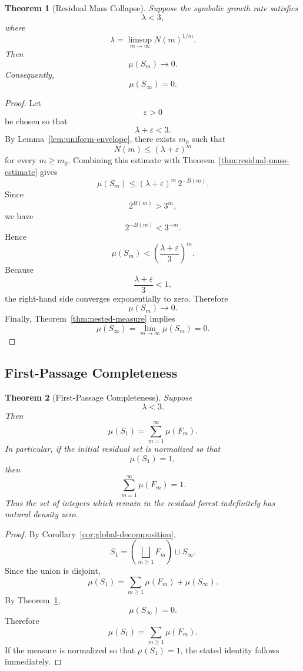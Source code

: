 \documentclass[12pt, oneside]{article}
\numberwithin{equation}{section}
\theoremstyle{definition}
\theoremstyle{plain}
\newtheorem{theorem}{Theorem}[section]
\theoremstyle{remark}
\begin{document}
\begin{theorem}[Residual Mass Collapse]
\label{thm:residual-mass-collapse}
Suppose the symbolic growth rate satisfies
\[
\lambda<3,
\]
where
\[
\lambda = \limsup_{m\to\infty} N(m)^{1/m}.
\]
Then
\[
\mu(S_m) \longrightarrow 0.
\]
Consequently,
\[
\mu(S_\infty) = 0.
\]
\end{theorem}

\begin{proof}
Let
\[
\varepsilon > 0
\]
be chosen so that
\[
\lambda + \varepsilon < 3.
\]
By Lemma~\ref{lem:uniform-envelope}, there exists
\(m_0\) such that
\[
N(m) \le (\lambda+\varepsilon)^m
\] 
for every \(m\ge m_0\).  Combining this estimate with
Theorem~\ref{thm:residual-mass-estimate} gives
\[
\mu(S_m) \le (\lambda+\varepsilon)^m \,2^{-B(m)}.
\]
Since
\[
2^{B(m)} > 3^m,
\]
we have
\[
2^{-B(m)} < 3^{-m}.
\]
Hence
\[ \mu(S_m) < \left( \frac{\lambda+\varepsilon}{3} \right)^m.
\]
Because
\[
\frac{\lambda+\varepsilon} {3} < 1,
\]
the right-hand side converges exponentially to zero. Therefore
\[
\mu(S_m) \to 0.
\]
Finally, Theorem~\ref{thm:nested-measure} implies
\[
\mu(S_\infty) = \lim_{m\to\infty}\mu(S_m) = 0.
\]
\end{proof}

\subsection{First-Passage Completeness}

\begin{theorem}[First-Passage Completeness]
\label{thm:first-passage-completeness}
Suppose
\[
\lambda < 3.
\]
Then
\[
\mu(S_1) = \sum_{m=1}^{\infty} \mu(F_m).
\]
In particular, if the initial residual set is normalized so that
\[
\mu(S_1) = 1,
\]
then
\[
\sum_{m=1}^{\infty} \mu(F_m) = 1.
\]
Thus the set of integers which remain in the residual forest
indefinitely has natural density zero.
\end{theorem}

\begin{proof}
By Corollary~\ref{cor:global-decomposition},
\[
S_1 = \left( \bigsqcup_{m\ge1}F_m \right) \sqcup S_\infty.
\]
Since the union is disjoint,
\[
\mu(S_1) = \sum_{m\ge1}\mu(F_m) + \mu(S_\infty).
\]
By Theorem~\ref{thm:residual-mass-collapse},
\[
\mu(S_\infty) = 0.
\]
Therefore
\[
\mu(S_1) = \sum_{m\ge1} \mu(F_m).
\]
If the measure is normalized so that \(\mu(S_1)=1\),
the stated identity follows immediately.
\end{proof}
\end{document}
